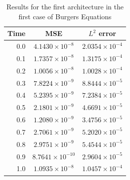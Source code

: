\documentclass[12pt,letterpaper]{article}
\begin{document}
\begin{table}[H]
  \begin{center}
  \begin{tabular}{ r | c  c }
  \textbf{Time} & \textbf{MSE} & \textbf{$L^2$ error} \\ \hline
  0.0 & $ 4.1430\times 10^{-8}$ & $ 2.0354\times 10^{-4} $ \\
  0.1 & $ 1.7357\times 10^{-8}$ & $ 1.3175\times 10^{-4} $ \\
  0.2 & $ 1.0056\times 10^{-8}$ & $ 1.0028\times 10^{-4} $ \\
  0.3 & $ 7.8224\times 10^{-9}$ & $ 8.8444\times 10^{-5} $ \\
  0.4 & $ 5.2395\times 10^{-9}$ & $ 7.2384\times 10^{-5} $ \\
  0.5 & $ 2.1801\times 10^{-9}$ & $ 4.6691\times 10^{-5} $ \\
  0.6 & $ 1.2080\times 10^{-9}$ & $ 3.4756\times 10^{-5} $ \\
  0.7 & $ 2.7061\times 10^{-9}$ & $ 5.2020\times 10^{-5} $ \\
  0.8 & $ 2.9751\times 10^{-9}$ & $ 5.4544\times 10^{-5} $ \\
  0.9 & $ 8.7641\times 10^{-10}$ & $ 2.9604\times 10^{-5} $ \\
  1.0 & $ 1.0935\times 10^{-8}$ & $ 1.0457\times 10^{-4} $ \\
  \end{tabular}
  \caption{Results for the first architecture in the first case of Burgers Equations}
  \label{tab:B11}
  \end{center}
  \end{table}
\end{document}

